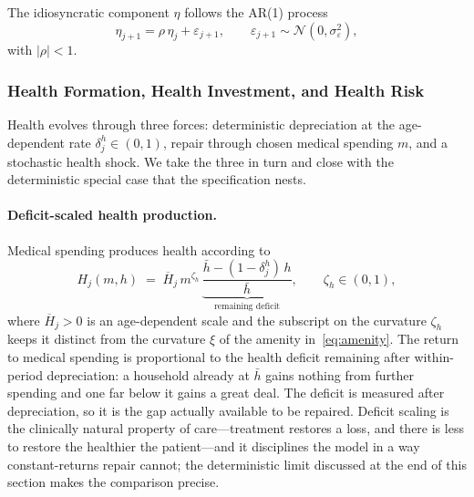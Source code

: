 \documentclass[12pt,a4paper]{article}
\begin{document}
The idiosyncratic component $\eta$ follows the AR(1) process
\begin{equation}
\label{eq:ar1}
\eta_{j+1} = \rho\, \eta_j + \varepsilon_{j+1}, \qquad \varepsilon_{j+1} \sim \mathcal{N}(0, \sigma_\varepsilon^2),
\end{equation}
with $|\rho| < 1$.

\subsubsection{Health Formation, Health Investment, and Health Risk}
\label{subsubsec:health}
\label{subsubsec:health_risk}

Health evolves through three forces: deterministic depreciation at the age-dependent rate $\delta^h_j \in (0,1)$, repair through chosen medical spending $m$, and a stochastic health shock. We take the three in turn and close with the deterministic special case that the specification nests.

\paragraph{Deficit-scaled health production.}
Medical spending produces health according to
\begin{equation}
\label{eq:health_production_deficit}
H_j(m, h) \;=\; \overline{H}_j\, m^{\zeta_h}\,
   \underbrace{\frac{\bar h - (1-\delta^h_j)\, h}{\bar h}}_{\text{remaining deficit}},
\qquad \zeta_h \in (0,1),
\end{equation}
where $\overline{H}_j > 0$ is an age-dependent scale and the subscript on the curvature $\zeta_h$ keeps it distinct from the curvature $\xi$ of the amenity in~\eqref{eq:amenity}. The return to medical spending is proportional to the health deficit remaining after within-period depreciation: a household already at $\bar h$ gains nothing from further spending and one far below it gains a great deal. The deficit is measured after depreciation, so it is the gap actually available to be repaired. Deficit scaling is the clinically natural property of care---treatment restores a loss, and there is less to restore the healthier the patient---and it disciplines the model in a way constant-returns repair cannot; the deterministic limit discussed at the end of this section makes the comparison precise.
\end{document}
